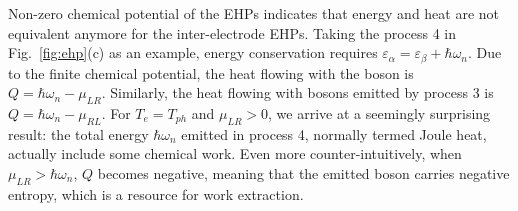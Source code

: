 \documentclass[aps
,twocolumn
,floatfix,footinbib,prl,longbibliography
]{revtex4-1}
\begin{document}
Non-zero chemical potential of the EHPs indicates that energy and heat are not equivalent anymore for the inter-electrode EHPs. Taking the process 4 in Fig.~\ref{fig:ehp}(c) as an example, energy conservation requires $\varepsilon_\alpha = \varepsilon_\beta +\hbar\omega_n$. Due to the finite chemical potential, the heat flowing with the boson is $Q=\hbar\omega_n-\mu_{LR}$.  Similarly, the heat flowing with bosons emitted by process 3 is $Q=\hbar\omega_n-\mu_{RL}$. For $T_e=T_{ph}$ and $\mu_{LR}>0$, we arrive at a seemingly surprising result: the total energy $\hbar\omega_n$ emitted in process 4, normally termed Joule heat, actually include some chemical work. Even more counter-intuitively, when $\mu_{LR}>\hbar\omega_n$, $Q$ becomes negative, meaning that the emitted boson carries negative entropy, which is a resource for work extraction.
\end{document}

